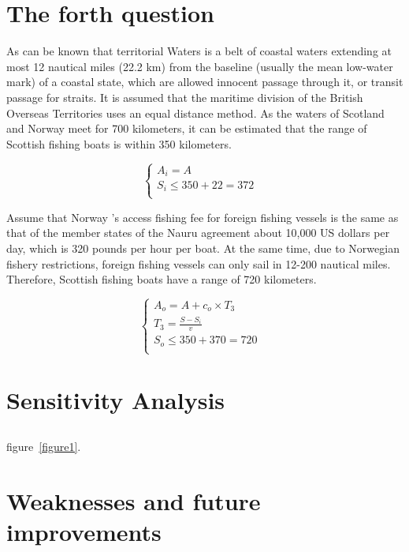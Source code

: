 \documentclass{mcmthesis}
\begin{document}
\section{The forth question}
As can be known that territorial Waters is a belt of coastal waters extending at most 12 nautical miles (22.2 km) from the baseline (usually the mean low-water mark) of a coastal state, which are allowed innocent passage through it, or transit passage for straits.
It is assumed that the maritime division of the British Overseas Territories uses an equal distance method. As the waters of Scotland and Norway meet for 700 kilometers, it can be estimated that the range of Scottish fishing boats is within 350 kilometers.

\begin{equation}
\left\{
\begin{array}{lr}
A_i=A &\\
S_i \leq 350+22 =372 \\
\end{array}
\right.
\end{equation}



Assume that Norway ’s access fishing fee for foreign fishing vessels is the same as that of the member states of the Nauru agreement about 10,000 US dollars per day, which is 320 pounds per hour per boat. At the same time, due to Norwegian fishery restrictions, foreign fishing vessels can only sail in 12-200 nautical miles. Therefore, Scottish fishing boats have a range of 720 kilometers.

\begin{equation}
\left\{
\begin{array}{lr}
A_o=A+c_o \times T_3 &\\
T_3=\frac{S-S_i}{v} &\\
S_o \leq 350+370=720 \\
\end{array}
\right.
\end{equation}

\section{Sensitivity Analysis}
\subsection{}

figure~\ref{figure1}.

\section{Weaknesses and future improvements}
\end{document}
